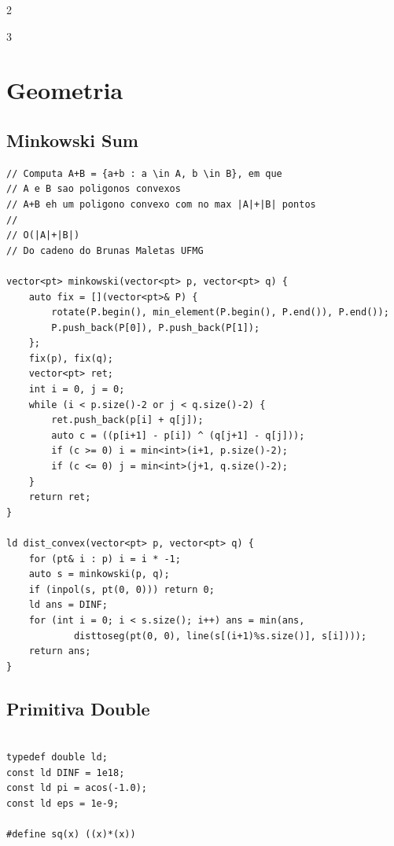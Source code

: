 \documentclass[9pt, a4paper, notitlepage]{extreport}
\begin{document}


\begin{multicols}{2}
\end{multicols}

\vspace{2mm}

\begin{multicols}{3}


%
%

\section{Geometria}

\subsection{Minkowski Sum}
\begin{verbatim}
// Computa A+B = {a+b : a \in A, b \in B}, em que
// A e B sao poligonos convexos
// A+B eh um poligono convexo com no max |A|+|B| pontos
//
// O(|A|+|B|)
// Do cadeno do Brunas Maletas UFMG

vector<pt> minkowski(vector<pt> p, vector<pt> q) {
	auto fix = [](vector<pt>& P) {
		rotate(P.begin(), min_element(P.begin(), P.end()), P.end());
		P.push_back(P[0]), P.push_back(P[1]);
	};
	fix(p), fix(q);
	vector<pt> ret;
	int i = 0, j = 0;
	while (i < p.size()-2 or j < q.size()-2) {
		ret.push_back(p[i] + q[j]);
		auto c = ((p[i+1] - p[i]) ^ (q[j+1] - q[j]));
		if (c >= 0) i = min<int>(i+1, p.size()-2);
		if (c <= 0) j = min<int>(j+1, q.size()-2);
	}
	return ret;
}

ld dist_convex(vector<pt> p, vector<pt> q) {
	for (pt& i : p) i = i * -1;
	auto s = minkowski(p, q);
	if (inpol(s, pt(0, 0))) return 0;
	ld ans = DINF;
	for (int i = 0; i < s.size(); i++) ans = min(ans,
			disttoseg(pt(0, 0), line(s[(i+1)%s.size()], s[i])));
	return ans;
}
\end{verbatim}

\subsection{Primitiva Double}
\begin{verbatim}

typedef double ld;
const ld DINF = 1e18;
const ld pi = acos(-1.0);
const ld eps = 1e-9;

#define sq(x) ((x)*(x))


\end{verbatim}
\end{multicols}
\end{document}
